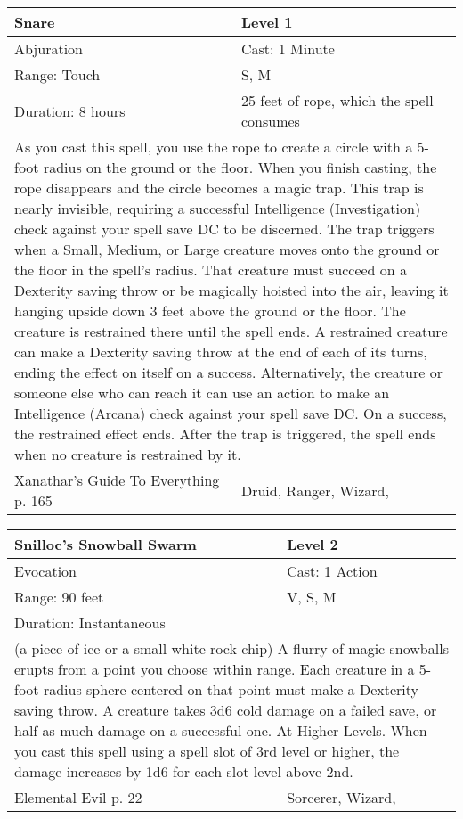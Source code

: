 \documentclass[11pt]{report}
\begin{document}
\begin{table}[H]
	\begin{tabular}{||p{6cm}|p{6cm}||}
		\hline\hline
		\bf{Snare} & Level 1\\ \hline
		Abjuration & Cast: 1 Minute\\ \hline
		Range: Touch & S, M\\ \hline
		Duration: 8 hours & 25 feet of rope, which the spell consumes\\ \hline
		\multicolumn{2}{||p{12cm}||}{As you cast this spell, you use the rope to create a circle with a 5-foot radius on the ground or the floor. When you finish casting, the rope disappears and the circle becomes a magic trap.
This trap is nearly invisible, requiring a successful Intelligence (Investigation) check against your spell save DC to be discerned.
The trap triggers when a Small, Medium, or Large creature moves onto the ground or the floor in the spell’s radius. That creature must succeed on a Dexterity saving throw or be magically hoisted into the air, leaving it hanging upside down 3 feet above the ground or the floor. The creature is restrained there until the spell ends.
A restrained creature can make a Dexterity saving throw at the end of each of its turns, ending the effect on itself on a success. Alternatively, the creature or someone else who can reach it can use an action to make an Intelligence (Arcana) check against your spell save DC. On a success, the restrained effect ends.
After the trap is triggered, the spell ends when no creature is restrained by it.}\\ \hline
Xanathar's Guide To Everything p. 165 & Druid, Ranger, Wizard, \\ \hline\hline
	\end{tabular}
\end{table}

\begin{table}[H]
	\begin{tabular}{||p{6cm}|p{6cm}||}
		\hline\hline
		\bf{Snilloc’s Snowball Swarm} & Level 2\\ \hline
		Evocation & Cast: 1 Action\\ \hline
		Range: 90 feet & V, S, M\\ \hline
		Duration: Instantaneous & \\ \hline
		\multicolumn{2}{||p{12cm}||}{(a piece of ice or a small white rock chip)
A flurry of magic snowballs erupts from a point you choose within range. Each creature in a 5-foot-radius sphere centered on that point must make a Dexterity saving throw. A creature takes 3d6 cold damage on a failed save, or half as much damage on a successful one.
At Higher Levels. When you cast this spell using a spell slot of 3rd level or higher, the damage increases by 1d6 for each slot level above 2nd.}\\ \hline
Elemental Evil p. 22 & Sorcerer, Wizard, \\ \hline\hline
	\end{tabular}
\end{table}
\end{document}
